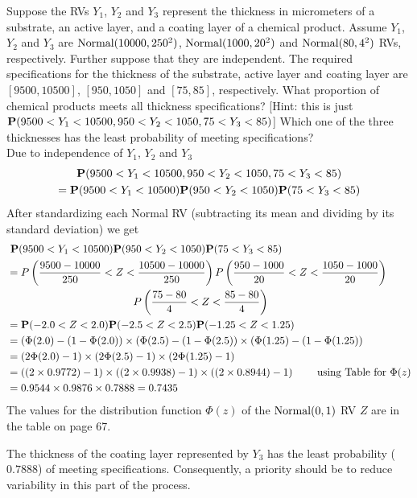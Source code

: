 \begin{ExerciseList}
\Exercise
Suppose the RVs $Y_1$, $Y_2$ and $Y_3$ represent the thickness in micrometers of a substrate, an active layer, and a coating layer of a chemical product.  
Assume $Y_1$, $Y_2$ and $Y_3$ are $\mbox{{\rm Normal}}(10000,250^2)$, $\mbox{{\rm Normal}}(1000,20^2)$ and $\mbox{{\rm Normal}}(80,4^2)$ RVs, respectively.  
Further suppose that they are independent.  
The required specifications for the thickness of the substrate, active layer and coating layer are $[9500,10500]$, $[950,1050]$ and $[75,85]$, respectively.  
What proportion of chemical products meets all thickness specifications? [Hint: this is just $\mathbf{P}(9500<Y_1<10500,950<Y_2<1050,75<Y_3<85)$]  Which one of the three thicknesses has the least probability of meeting specifications?   
\Answer
~\\
Due to independence of $Y_1$, $Y_2$ and $Y_3$
\begin{multline*}
\mathbf{P}(9500<Y_1<10500,950<Y_2<1050,75<Y_3<85)\\ = \mathbf{P}(9500<Y_1<10500) \mathbf{P}(950<Y_2<1050) \mathbf{P}(75<Y_3<85)
\end{multline*}
After standardizing each Normal RV (subtracting its mean and dividing by its standard deviation) we get
\begin{align*}
&~ \mathbf{P}(9500<Y_1<10500) \mathbf{P}(950<Y_2<1050) \mathbf{P}(75<Y_3<85)\\
&=  P\left(\frac{9500-10000}{250}< Z < \frac{10500-10000}{250} \right) P\left( \frac{950-1000}{20}<Z<\frac{1050-1000}{20}\right)\\
&\qquad \qquad \qquad \qquad \qquad \qquad P\left(\frac{75-80}{4}<Z<\frac{85-80}{4}\right)\\
&= \mathbf{P}(-2.0<Z<2.0) \mathbf{P}(-2.5<Z<2.5) \mathbf{P}(-1.25<Z<1.25) \\
&= (\Phi(2.0)-(1-\Phi(2.0)) \times (\Phi(2.5)-(1-\Phi(2.5)) \times (\Phi(1.25)-(1-\Phi(1.25))\\
&= (2\Phi(2.0)-1) \times (2\Phi(2.5)-1) \times (2\Phi(1.25)-1)\\
&= ((2 \times 0.9772) -1) \times ((2 \times 0.9938) - 1) \times ((2 \times 0.8944)-1) \qquad \text{ using Table for $\Phi(z)$} \\
&= 0.9544 \times 0.9876 \times 0.7888 = 0.7435
\end{align*}
The values for the distribution function $\Phi(z)$ of the $\mbox{{\rm Normal}}(0,1)$ RV $Z$ are in the table on page 67. 

The thickness of the coating layer represented by $Y_3$ has the least probability ($0.7888$) of meeting specifications.  Consequently, a priority should be to reduce variability in this part of the process.


\end{ExerciseList}
